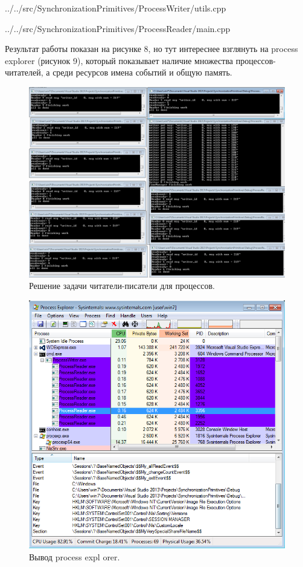 \documentclass[a4paper, 12pt]{article}		%
\begin{document}

{../../src/SynchronizationPrimitives/ProcessWriter/utils.cpp}


{../../src/SynchronizationPrimitives/ProcessReader/main.cpp}

Результат работы показан на рисунке 8, но тут интереснее взглянуть на process explorer (рисунок 9), который показывает наличие множества процессов-читателей, а среди ресурсов имена событий и общую память.

\begin{figure}[h!]
\centering
\includegraphics[scale=0.45]{res/007}
\caption{Решение задачи читатели-писатели для процессов.}
\end{figure}

\begin{figure}[h!]
\centering
\includegraphics[scale=0.45]{res/pe_07}
\caption{Вывод process expl
orer.}
\end{figure}
\newpage
\end{document}
